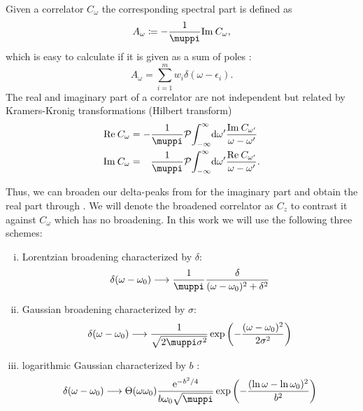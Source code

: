 Given a correlator $C_\omega$ the corresponding spectral part is defined as
\begin{equation}
    A_\omega \coloneq -\frac{1}{\muppi}\Im C_\omega,
\end{equation}
which is easy to calculate if it is given as a sum of poles :
\begin{equation}
    A_\omega = \sum_{i=1}^m w_i \delta(\omega - \epsilon_i).
    \label{eq:spectral-sum}
\end{equation}
The real and imaginary part of a correlator are not independent
but related by Kramers-Kronig transformations (Hilbert transform)
\begin{subequations}
    \begin{align}
        \Re C_\omega
         & =
        - \frac{1}{\muppi} \mathcal{P}\! \int_{-\infty}^\infty\! \md\omega'
        \frac{\Im C_{\omega'}}{\omega - \omega'}
        \label{eq:kramers-kroneg-real} \\
        \Im C_\omega
         & =
        \phantom{-} \frac{1}{\muppi} \mathcal{P}\! \int_{-\infty}^\infty\! \md\omega'
        \frac{\Re C_{\omega'}}{\omega - \omega'}.
        \label{eq:kramers-kronig-imag}
    \end{align}
\end{subequations}

Thus, we can broaden our delta-peaks from 
for the imaginary part and obtain the real part through .
We will denote the broadened correlator as $C_z$
to contrast it against $C_\omega$ which has no broadening.
In this work we will use the following three schemes:
\begin{enumerate}[(i)]
    \item Lorentzian broadening characterized by $\delta$:
          \label{item:lorentzian}
          \begin{equation}
              \delta(\omega - \omega_0)
              \longrightarrow
              \frac{1}{\muppi}\frac{\delta}{(\omega - \omega_0)^2 + \delta^2}
          \end{equation}
    \item Gaussian broadening characterized by $\sigma$:
          \label{item:gaussian}
          \begin{equation}
              \delta(\omega - \omega_0)
              \longrightarrow
              \frac{1}{\sqrt{2\muppi \sigma^2}}\exp\left(-\frac{(\omega - \omega_0)^2}{2\sigma^2}\right)
          \end{equation}
    \item logarithmic Gaussian characterized by $b$ \cite{Bulla2008}:
          \label{item:logarithmic-gaussian}
          \begin{equation}
              \delta(\omega - \omega_0)
              \longrightarrow
              \Theta(\omega\omega_0)\frac{\me^{-b^2/4}}{b\omega_0\sqrt{\muppi}}\exp\left(-\frac{(\ln\omega-\ln\omega_0)^2}{b^2}\right)
          \end{equation}
\end{enumerate}


